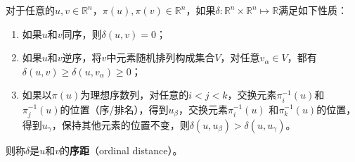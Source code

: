 \begin{definition}[序距]
对于任意的$u,v\in \mathbb{R}^n$，$\pi(u),\pi(v)\in \mathbb{R}^n$，如果$\delta:\mathbb{R}^n \times \mathbb{R}^n \mapsto \mathbb{R}$满足如下性质：
\begin{enumerate}
\item 如果$u$和$v$同序，则$\delta(u,v)=0$；
\item 如果$u$和$v$逆序，将$v$中元素随机排列构成集合$V$，对任意$v_\alpha\in V$，都有$\delta(u,v)\ge \delta(u,v_\alpha)\ge 0$；
\item 如果以$\pi(u)$为理想序数列，对任意的$i<j<k$，交换元素$\pi_i^{-1}(u)$和$\pi_j^{-1}(u)$的位置（序/排名），得到$u_\beta$，交换元素$\pi_i^{-1}(u)$ 和$\pi_k^{-1}(u)$的位置，得到$u_\gamma$，保持其他元素的位置不变，则$\delta(u,u_\beta)> \delta(u,u_\gamma)$。
\end{enumerate}
则称$\delta$是$u$和$v$的\textbf{序距}（ordinal distance）。
\end{definition}

\begin{definition}[序稳定性与序收敛准则]%

\end{definition}

